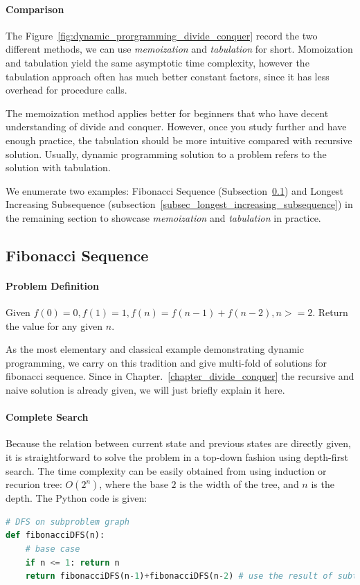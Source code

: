 \documentclass[../main.tex]{subfiles}
\begin{document}
\paragraph{Comparison}
The Figure~\ref{fig:dynamic_prorgramming_divide_conquer} record the two different methods, we can use \textit{memoization} and \textit{tabulation} for short.  Momoization and tabulation yield the same asymptotic time complexity, however the tabulation approach often has much better constant factors, since it has less overhead for procedure calls. 

The memoization method applies better for beginners that who have decent understanding of divide and conquer. However, once you study further and have enough practice, the tabulation should be more intuitive compared with recursive solution. Usually, dynamic programming solution to a problem refers to the solution with tabulation. 



We enumerate two examples: Fibonacci Sequence (Subsection~\ref{subsec_fibonacci_sequence}) and Longest Increasing Subsequence (subsection~\ref{subsec_longest_increasing_subsequence}) in the remaining section to showcase \textit{memoization} and \textit{tabulation} in practice. 

\subsection{Fibonacci Sequence}
\label{subsec_fibonacci_sequence}
\paragraph{Problem Definition}
Given $f(0)=0, f(1)= 1, f(n) = f(n-1) + f(n-2), n>=2$. Return the value for any given $n$.

As the most elementary and classical example demonstrating dynamic programming, we carry on this tradition and give multi-fold of solutions for fibonacci sequence. Since in Chapter.~\ref{chapter_divide_conquer} the recursive and naive solution is already given, we will just briefly explain it here. 

\paragraph{Complete Search}  Because the relation between current state and previous states are directly given, it is straightforward to solve the problem in a top-down fashion using depth-first search. The time complexity can be easily obtained from using induction or recurion tree: $O(2^n)$, where the base $2$ is the width of the tree, and $n$ is the depth. The Python code is given:
\begin{lstlisting}[language = Python]
# DFS on subproblem graph
def fibonacciDFS(n):
    # base case
    if n <= 1: return n
    return fibonacciDFS(n-1)+fibonacciDFS(n-2) # use the result of subtree to build up the result of current tree. 
\end{lstlisting}
\end{document}
